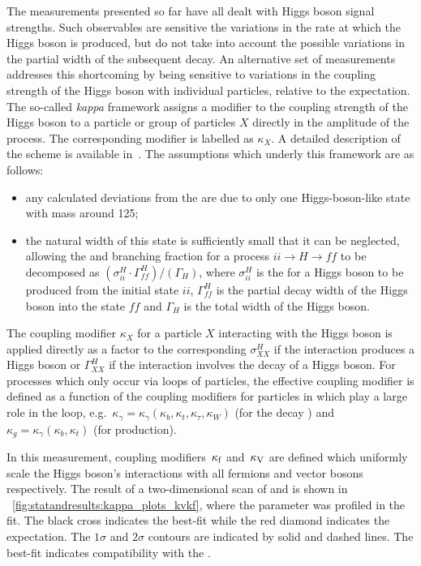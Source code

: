 The measurements presented so far have all dealt with Higgs boson signal strengths. Such observables are sensitive the variations in the rate at which the Higgs boson is produced, but do not take into account the possible variations in the partial width of the subsequent decay. An alternative set of measurements addresses this shortcoming by being sensitive to variations in the coupling strength of the Higgs boson with individual particles, relative to the \SM expectation. The so-called \emph{kappa} framework assigns a modifier to the coupling strength of the Higgs boson to a particle or group of particles $X$ directly in the amplitude of the process. The corresponding modifier is labelled as $\kappa_{X}$. A detailed description of the scheme is available in~\cite{Khachatryan:2016vau}.  
The assumptions which underly this framework are as follows: 
\begin{itemize}
\item any calculated deviations from the \SM are due to only one Higgs-boson-like state with mass around 125\GeV;
\item the natural width of this state is sufficiently small that it can be neglected, allowing the \crosssection and branching fraction for a process $ii\rightarrow H \rightarrow ff$ to be decomposed as $(\sigma_{ii}^{H} \cdot \Gamma_{ff}^{H}) / (\Gamma_H)$, where $\sigma_{ii}^{H}$ is the \crosssection for a Higgs boson to be produced from the initial state $ii$,  $\Gamma^{H}_{ff}$ is the partial decay width of the Higgs boson into the state $ff$ and $\Gamma_{H}$ is the total width of the Higgs boson.
\end{itemize}

The coupling modifier $\kappa_{X}$ for a particle $X$ interacting with the Higgs boson is applied directly as a factor to the corresponding $\sigma_{XX}^{H}$ if the interaction produces a Higgs boson or $\Gamma^{H}_{XX}$ if the interaction involves the decay of  a Higgs boson. For processes which only occur via loops of particles, the effective coupling modifier is defined as a function of the coupling modifiers for particles in which play a large role in the loop, e.g.~$\kappa_{\gamma} = \kappa_{\gamma}(\kappa_b, \kappa_t,\kappa_\tau,\kappa_W) $ (for the decay \Hgg) and $\kappa_{g} = \kappa_{\gamma}(\kappa_b, \kappa_t) $ (for \ggH production). 

In this measurement, coupling modifiers $\,\kappa_\text{f}$ and $\,\kappa_\text{V}$ are defined which uniformly scale the Higgs boson's interactions with all fermions and vector bosons respectively. The result of a two-dimensional \DNLL scan of \kf and \kV is shown in \Fig~\ref{fig:statandresults:kappa_plots_kvkf}, where the \mH parameter was profiled in the fit. The black cross indicates the best-fit while the red diamond indicates the \SM expectation. The $1\sigma$ and $2\sigma$ contours are indicated by solid and dashed lines. The best-fit indicates compatibility with the \SM. 

